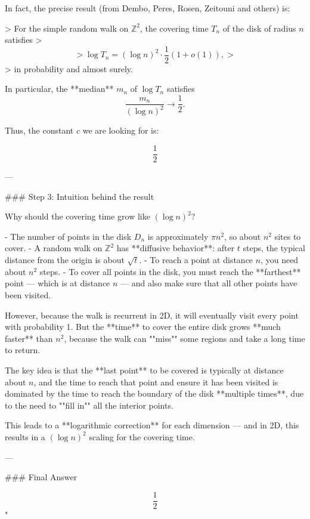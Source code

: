 \documentclass[11pt]{article}
\begin{document}
In fact, the precise result (from Dembo, Peres, Rosen, Zeitouni and others) is:

> For the simple random walk on $\mathbb{Z}^2$, the covering time $T_n$ of the disk of radius $n$ satisfies
> $$
> \log T_n = (\log n)^2 \cdot \frac{1}{2} (1 + o(1)),
> $$
> in probability and almost surely.

In particular, the **median** $m_n$ of $\log T_n$ satisfies
$$
\frac{m_n}{(\log n)^2} \to \frac{1}{2}.
$$

Thus, the constant $c$ we are looking for is:

$$
\boxed{\frac{1}{2}}
$$

---

### Step 3: Intuition behind the result

Why should the covering time grow like $(\log n)^2$?

- The number of points in the disk $D_n$ is approximately $\pi n^2$, so about $n^2$ sites to cover.
- A random walk on $\mathbb{Z}^2$ has **diffusive behavior**: after $t$ steps, the typical distance from the origin is about $\sqrt{t}$.
- To reach a point at distance $n$, you need about $n^2$ steps.
- To cover all points in the disk, you must reach the **farthest** point — which is at distance $n$ — and also make sure that all other points have been visited.

However, because the walk is recurrent in 2D, it will eventually visit every point with probability 1. But the **time** to cover the entire disk grows **much faster** than $n^2$, because the walk can ""miss"" some regions and take a long time to return.

The key idea is that the **last point** to be covered is typically at distance about $n$, and the time to reach that point and ensure it has been visited is dominated by the time to reach the boundary of the disk **multiple times**, due to the need to ""fill in"" all the interior points.

This leads to a **logarithmic correction** for each dimension — and in 2D, this results in a $(\log n)^2$ scaling for the covering time.

---

### Final Answer

$$
\boxed{\frac{1}{2}}
$$"
\end{document}
